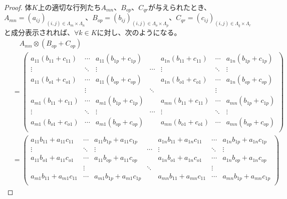 \documentclass[dvipdfmx]{jsarticle}
\begin{document}
\begin{proof}
体$K$上の適切な行列たち$A_{mn}$、$B_{op}$、$C_{qr}$が与えられたとき、$A_{mn} = \left( a_{ij} \right)_{(i,j) \in \varLambda_{m} \times \varLambda_{n}}$、$B_{op} = \left( b_{ij} \right)_{(i,j) \in \varLambda_{o} \times \varLambda_{p}}$、$C_{qr} = \left( c_{ij} \right)_{(i,j) \in \varLambda_{q} \times \varLambda_{r}}$と成分表示されれば、$\forall k \in K$に対し、次のようになる。
\begin{align*}
&\quad A_{mn} \otimes \left( B_{op} + C_{op} \right)\\
&= \begin{pmatrix}
a_{11}\left( b_{11} + c_{11} \right) & \cdots & a_{11}\left( b_{1p} + c_{1p} \right) & \  & a_{1n}\left( b_{11} + c_{11} \right) & \cdots & a_{1n}\left( b_{1p} + c_{1p} \right) \\
 \vdots & \ddots & \vdots & \cdots & \vdots & \ddots & \vdots \\
a_{11}\left( b_{o1} + c_{o1} \right) & \cdots & a_{11}\left( b_{op} + c_{op} \right) & \  & a_{1n}\left( b_{o1} + c_{o1} \right) & \cdots & a_{1n}\left( b_{op} + c_{op} \right) \\
\  & \vdots & \  & \ddots & \  & \vdots & \  \\
a_{m1}\left( b_{11} + c_{11} \right) & \cdots & a_{m1}\left( b_{1p} + c_{1p} \right) & \  & a_{mn}\left( b_{11} + c_{11} \right) & \cdots & a_{mn}\left( b_{1p} + c_{1p} \right) \\
 \vdots & \ddots & \vdots & \cdots & \vdots & \ddots & \vdots \\
a_{m1}\left( b_{o1} + c_{o1} \right) & \cdots & a_{m1}\left( b_{op} + c_{op} \right) & \  & a_{mn}\left( b_{o1} + c_{o1} \right) & \cdots & a_{mn}\left( b_{op} + c_{op} \right) \\
\end{pmatrix}\\
&= \begin{pmatrix}
a_{11}b_{11} + a_{11}c_{11} & \cdots & a_{11}b_{1p} + a_{11}c_{1p} & \  & a_{1n}b_{11} + a_{1n}c_{11} & \cdots & a_{1n}b_{1p} + a_{1n}c_{1p} \\
 \vdots & \ddots & \vdots & \cdots & \vdots & \ddots & \vdots \\
a_{11}b_{o1} + a_{11}c_{o1} & \cdots & a_{11}b_{op} + a_{11}c_{op} & \  & a_{1n}b_{o1} + a_{1n}c_{o1} & \cdots & a_{1n}b_{op} + a_{1n}c_{op} \\
\  & \vdots & \  & \ddots & \  & \vdots & \  \\
a_{m1}b_{11} + a_{m1}c_{11} & \cdots & a_{m1}b_{1p} + a_{m1}c_{1p} & \  & a_{mn}b_{11} + a_{mn}c_{11} & \cdots & a_{mn}b_{1p} + a_{mn}c_{1p} \\

\end{pmatrix}
\end{align*}
\end{proof}
\end{document}
